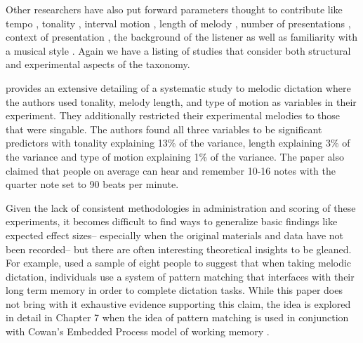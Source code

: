 \documentclass[12pt,]{book}
\begin{document}
Other researchers have also put forward parameters thought to contribute like tempo \citep{hofstetterComputerBaesedRecognitionPerceptual1981}, tonality \citep{dowlingScaleContourTwo1978, longRelationshipsPitchMemory1977, pembrookInterferenceTranscriptionProcess1986, ouraMemoryMelodiesSubjects1988}, interval motion \citep{ortmannTonalDeterminantsMelodic1933, pembrookInterferenceTranscriptionProcess1986}, length of melody \citep{longRelationshipsPitchMemory1977, pembrookInterferenceTranscriptionProcess1986}, number of presentations \citep{hofstetterComputerBaesedRecognitionPerceptual1981, pembrookInterferenceTranscriptionProcess1986},
context of presentation \citep{schellenbergEffectTonalRhythmicContext1985},
the background of the listener \citep{longRelationshipsPitchMemory1977, ouraMemoryMelodiesSubjects1988, schellenbergEffectTonalRhythmicContext1985, taylorStrategiesMemoryShort1983} as well as familiarity with a musical style \citep{schellenbergEffectTonalRhythmicContext1985}.
Again we have a listing of studies that consider both structural and experimental aspects of the taxonomy.

\citet{pembrookInterferenceTranscriptionProcess1986} provides an extensive detailing of a systematic study to melodic dictation where the authors used tonality, melody length, and type of motion as variables in their experiment.
They additionally restricted their experimental melodies to those that were singable.
The authors found all three variables to be significant predictors with tonality explaining 13\% of the variance, length explaining 3\% of the variance and type of motion explaining 1\% of the variance.
The paper also claimed that people on average can hear and remember 10-16 notes with the quarter note set to 90 beats per minute.

Given the lack of consistent methodologies in administration and scoring of these experiments, it becomes difficult to find ways to generalize basic findings like expected effect sizes-- especially when the original materials and data have not been recorded-- but there are often interesting theoretical insights to be gleaned.
For example, \citet{ouraConstructingRepresentationMelody1991a} used a sample of eight people to suggest that when taking melodic dictation, individuals use a system of pattern matching that interfaces with their long term memory in order to complete dictation tasks.
While this paper does not bring with it exhaustive evidence supporting this claim, the idea is explored in detail in Chapter 7 when the idea of pattern matching is used in conjunction with Cowan's Embedded Process model of working memory \citep{cowanEvolvingConceptionsMemory1988}.
\end{document}
